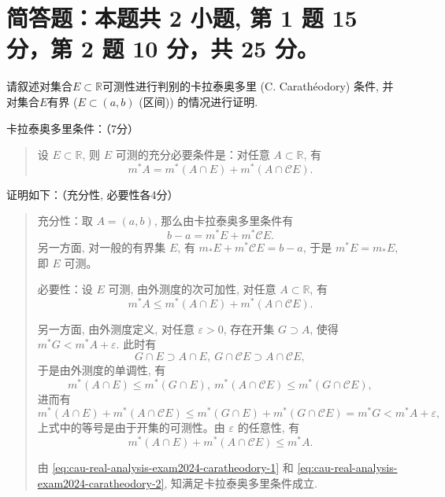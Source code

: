 \section{简答题：本题共 2 小题, 第 1 题 15 分，第 2 题 10 分，共 25 分。}



\begin{question}[points = 15]
  请叙述对集合$E\subset \mathbb{R}$可测性进行判别的卡拉泰奥多里 (C. Carathéodory) 条件, 并对集合$E$有界 ($E \subset (a, b)$ (区间)) 的情况进行证明.
\end{question}

\begin{solution}
  卡拉泰奥多里条件：（7分）

  \begin{quote}
  设 \(E \subset \mathbb{R}\), 则 \(E\) 可测的充分必要条件是：对任意 \(A \subset \mathbb{R}\), 有
  \[m^* A = m^*(A \cap E) + m^*(A \cap \mathscr{C} E).\]
  \end{quote}

  证明如下：（充分性, 必要性各4分）

  \begin{quote}
  充分性：取 \(A = (a, b)\), 那么由卡拉泰奥多里条件有
  \[b - a = m^* E + m^* \mathscr{C} E.\]
  另一方面, 对一般的有界集 \(E\), 有 \(m_* E + m^* \mathscr{C} E = b - a\), 于是 \(m^* E = m_* E\), 即 \(E\) 可测。

  必要性：设 \(E\) 可测, 由外测度的次可加性, 对任意 \(A \subset \mathbb{R}\), 有
  \begin{equation}
  \label{eq:cau-real-analysis-exam2024-caratheodory-1}
  m^* A \leqslant m^*(A \cap E) + m^*(A \cap \mathscr{C} E).
  \end{equation}

  另一方面, 由外测度定义, 对任意 \(\varepsilon > 0\), 存在开集 \(G \supset A\), 使得 \(m^* G < m^* A + \varepsilon\). 此时有
  \[G \cap E \supset A \cap E, ~ G \cap \mathscr{C} E \supset A \cap \mathscr{C} E,\]
  于是由外测度的单调性, 有
  \[m^* (A \cap E) \leqslant m^* (G \cap E), ~ m^* (A \cap \mathscr{C} E) \leqslant m^* (G \cap \mathscr{C} E),\]
  进而有
  \[m^* (A \cap E) + m^* (A \cap \mathscr{C} E) \leqslant m^* (G \cap E) + m^* (G \cap \mathscr{C} E) = m^* G < m^* A + \varepsilon,\]
  上式中的等号是由于开集的可测性。由 \(\varepsilon\) 的任意性, 有
  \begin{equation}
  \label{eq:cau-real-analysis-exam2024-caratheodory-2}
  m^* (A \cap E) + m^* (A \cap \mathscr{C} E) \leqslant m^* A.
  \end{equation}

  由 \eqref{eq:cau-real-analysis-exam2024-caratheodory-1} 和 \eqref{eq:cau-real-analysis-exam2024-caratheodory-2}, 知满足卡拉泰奥多里条件成立.
  \end{quote}
\end{solution}

